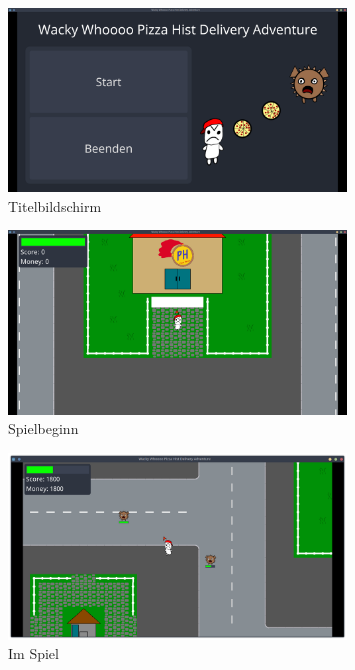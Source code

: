 \documentclass{article}
\begin{document}
			\begin{figure}[H]
				\begin{center}
					\includegraphics[width=0.8\textwidth]{start2.png}
				\end{center}
				\caption{Titelbildschirm}
			\end{figure}
			\begin{figure}[H]
				\begin{center}
					\includegraphics[width=0.8\textwidth]{spielbeginn.png}
				\end{center}
				\caption{Spielbeginn}
			\end{figure}
			\begin{figure}[H]
				\begin{center}
					\includegraphics[width=0.8\textwidth]{ingame2.png}
				\end{center}
				\caption{Im Spiel}
			\end{figure}
\end{document}

